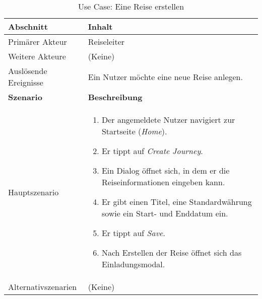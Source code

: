\begin{table}[H]
	\caption{Use Case: Eine Reise erstellen}
	\footnotesize
	\begin{tabularx}{0.95\textwidth}{ |l|X| }
		\hline
		\rowcolor{gray} \textbf{Abschnitt}     & \textbf{Inhalt}                                                                                                                     \\
		\hline
		Primärer Akteur                        & Reiseleiter                                                                                                                         \\
		\hline
		Weitere Akteure                        & (Keine)                                                                                                                             \\
		\hline
		Auslösende Ereignisse                  & Ein Nutzer möchte eine neue Reise anlegen.                                                                                          \\
		\hline
		\rowcolor{lightgray} \textbf{Szenario} & \textbf{Beschreibung}                                                                                                               \\
		\hline
		Hauptszenario                          & \begin{enumerate}
			                                         \item Der angemeldete Nutzer navigiert zur Startseite (\emph{Home}).
			                                         \item Er tippt auf \emph{Create Journey}.
			                                         \item Ein Dialog öffnet sich, in dem er die Reiseinformationen eingeben kann.
			                                         \item Er gibt einen Titel, eine Standardwährung sowie ein Start- und Enddatum ein.
			                                         \item Er tippt auf \emph{Save}.
			                                         \item Nach Erstellen der Reise öffnet sich das Einladungsmodal.
		                                         \end{enumerate}                                                   \\
		\hline
		Alternativszenarien                    & (Keine)                                                                                                                             \\

\end{tabularx}
\end{table}
